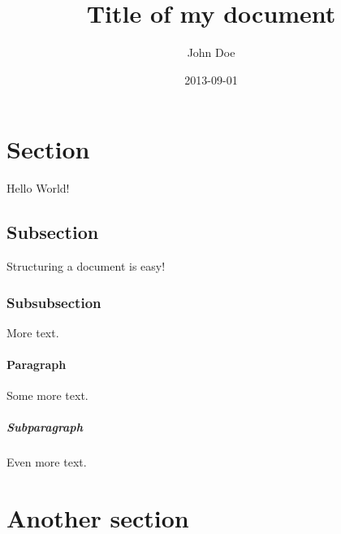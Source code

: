 \documentclass{article}
\title{Title of my document}
\date{2013-09-01}
\author{John Doe}
\begin{document}
\maketitle
{}
\newpage
{}

\section{Section}

Hello World!

\subsection{Subsection}

Structuring a document is easy!

\subsubsection{Subsubsection}

More text.

\paragraph{Paragraph}

Some more text.

\subparagraph{Subparagraph}

Even more text.

\section{Another section}
\end{document}
